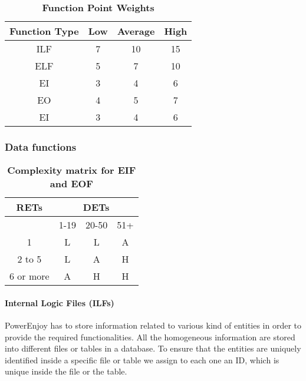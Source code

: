 \begin{longtable}{| c | c | c | c |}
	\caption{\textbf{Function Point Weights}} %
	\label{tab:fp_weights}%
	\\ \hline %
	
	\textbf{Function Type} & \textbf{Low} & \textbf{Average} & \textbf{High}\\ \hline
	ILF & 7 & 10 & 15\\ \hline
	ELF & 5 & 7 & 10\\ \hline
	EI & 3 & 4 & 6\\ \hline
	EO & 4 & 5 & 7\\ \hline
	EI & 3 & 4 & 6\\ \hline	
\end{longtable}

\subsubsection{Data functions}
\begin{longtable}{| c | c | c | c |}
	\caption{\textbf{Complexity matrix for EIF and EOF}} %
	\label{tab:ilf_elf_complexity_matrix}%
	\\ \hline %
	
	\textbf{RETs} &	\multicolumn{3}{c|}{\textbf{DETs}} \\ \hline
	  & 1-19 & 20-50 & 51+\\ \hline 
	1 & L & L & A\\ \hline 
	2 to 5 & L & A & H\\ \hline 
	6 or more & A & H & H \\ \hline 
\end{longtable}

\paragraph{Internal Logic Files (ILFs)}
PowerEnjoy has to store information related to various kind of entities in order to provide the required functionalities. All the homogeneous information are stored into different files or tables in a database. To ensure that the entities are uniquely identified inside a specific file or table we assign to each one an ID, which is unique inside the file or the table.
\smallskip


